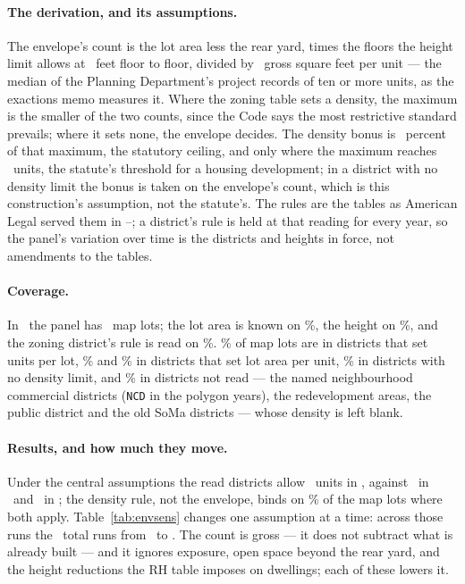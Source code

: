\documentclass[11pt]{article}
\newcommand{\envtable}[1]{\def\envtab{#1}}
\begin{document}
\paragraph{The derivation, and its assumptions.} The envelope's count is the lot area less the
rear yard, times the floors the height limit allows at \envFloor\ feet floor to floor, divided
by \envGpu\ gross square feet per unit --- the median of the Planning Department's project
records of ten or more units, as the exactions memo measures it. Where the zoning table sets a density, the
maximum is the smaller of the two counts, since the Code says the most restrictive standard
prevails; where it sets none, the envelope decides. The density bonus is \envDblPct\ percent of that
maximum, the statutory ceiling, and only where the maximum reaches \envDblMin\ units, the
statute's threshold for a housing development; in a district with no density limit the bonus is taken on
the envelope's count, which is this construction's assumption, not the statute's. The rules are
the tables as American Legal served them in \envReadFrom--\envReadTo; a district's rule is held at that reading for
every year, so the panel's variation over time is the districts and heights in force, not
amendments to the tables.

\paragraph{Coverage.} In \envYearLast\ the panel has \envParcels\ map lots; the lot area is
known on \envLot\%, the height on \envHeight\%, and the zoning district's rule is read on
\envRead\%. \envKindPerLot\% of map lots are in districts that set units per lot, \envKindPerAreaThree\%
and \envKindPerArea\% in districts that set lot area per unit, \envKindNone\% in districts with
no density limit, and \envKindUnread\% in districts not read --- the named neighbourhood
commercial districts (\texttt{NCD} in the polygon years), the redevelopment areas, the public
district and the old SoMa districts --- whose density is left blank.

\envtable{envrules}

\paragraph{Results, and how much they move.} Under the central assumptions the read
districts allow \envUnitsTotal\ units in \envYearLast, against \envUnitsSixteen\ in \envYearB\ and
\envUnitsEight\ in \envYearA; the density rule, not the envelope, binds on \envDensityBinds\% of the
map lots where both apply. Table~\ref{tab:envsens} changes one assumption at a time: across
those runs the \envYearLast\ total runs from \envSensLo\ to \envSensHi. The count is gross ---
it does not subtract what is already built --- and it ignores exposure, open space beyond the
rear yard, and the height reductions the RH table imposes on dwellings; each of these lowers it.
\end{document}
